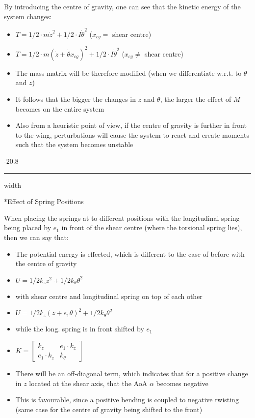 \documentclass[8pt, landscape, fleqn]{scrartcl}
\makeatletter
\renewcommand{\subsubsection}{\@startsection{subsubsection}{1}{0mm}%
{-2\baselineskip}{0.8\baselineskip}%
{\hrule depth 0.2pt width\columnwidth\vspace*{1.2em}\normalsize\bfseries\rmfamily}}
\makeatother
\begin{document}
\begin{multicols*}{3}
By introducing the centre of gravity, one can see that the kinetic energy of the system changes: 

\begin{itemize}
    \item $T= 1/2 \cdot m \dot{z}^2 + 1/2 \cdot I \dot{\theta}^2$ ($x_{cg} = $ shear centre)
    \item $T = 1/2 \cdot m (\dot{z}+\dot{\theta} x_{cg})^2 + 1/2 \cdot I \dot{\theta}^2$ ($x_{cg} \neq $ shear centre)
    \item The mass matrix will be therefore modified (when we differentiate w.r.t. to $\theta$ and $z$)
    \item It follows that the bigger the changes in $z$ and $\theta$, the larger the effect of $M$ becomes on the entire system
    \item Also from a heuristic point of view, if the centre of gravity is further in front to the wing, perturbations will cause the system to react and create moments such that the system becomes unstable
\end{itemize}

\subsubsection*{Effect of Spring Positions}

When placing the springs at to different positions with the longitudinal spring being placed by $e_1$ in front of the shear centre (where the torsional spring lies), then we can say that:

    \begin{itemize}
        \item The potential energy is effected, which is different to the case of before with the centre of gravity
        \item $U = 1/2 k_z z^2 + 1/2 k_\theta \theta^2$
        \item with shear centre and longitudinal spring on top of each other
        \item $U = 1/2 k_z (z+e_1 \theta)^2 + 1/2 k_\theta \theta^2$
        \item while the long. spring is in front shifted by $e_1$
        \item $K = \begin{bmatrix}
            k_z & e_1\cdot k_z \\ e_1 \cdot k_z & k_\theta
        \end{bmatrix}$
        \item There will be an off-diagonal term, which indicates that for a positive change in $z$ located at the shear axis, that the AoA $\alpha$ becomes negative
        \item This is favourable, since a positive bending is coupled to negative twisting (same case for the centre of gravity being shifted to the front)
    \end{itemize}



\end{multicols*}
\end{document}
